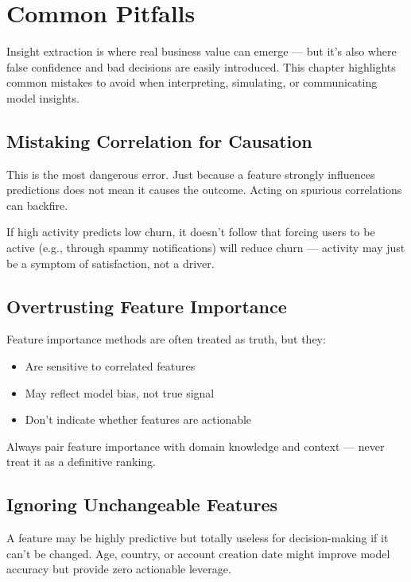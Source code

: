 \documentclass[12pt,openany]{book}
\begin{document}
\chapter{Common Pitfalls}

Insight extraction is where real business value can emerge — but it’s also where false confidence and bad decisions are easily introduced. This chapter highlights common mistakes to avoid when interpreting, simulating, or communicating model insights.

\section{Mistaking Correlation for Causation}

This is the most dangerous error. Just because a feature strongly influences predictions does not mean it causes the outcome. Acting on spurious correlations can backfire.

\begin{examplebox}
If high activity predicts low churn, it doesn’t follow that forcing users to be active (e.g., through spammy notifications) will reduce churn — activity may just be a symptom of satisfaction, not a driver.
\end{examplebox}

\section{Overtrusting Feature Importance}

Feature importance methods are often treated as truth, but they:
\begin{itemize}
  \item Are sensitive to correlated features
  \item May reflect model bias, not true signal
  \item Don’t indicate whether features are actionable
\end{itemize}

\begin{notebox}
Always pair feature importance with domain knowledge and context — never treat it as a definitive ranking.
\end{notebox}

\section{Ignoring Unchangeable Features}

A feature may be highly predictive but totally useless for decision-making if it can’t be changed. Age, country, or account creation date might improve model accuracy but provide zero actionable leverage.
\end{document}
